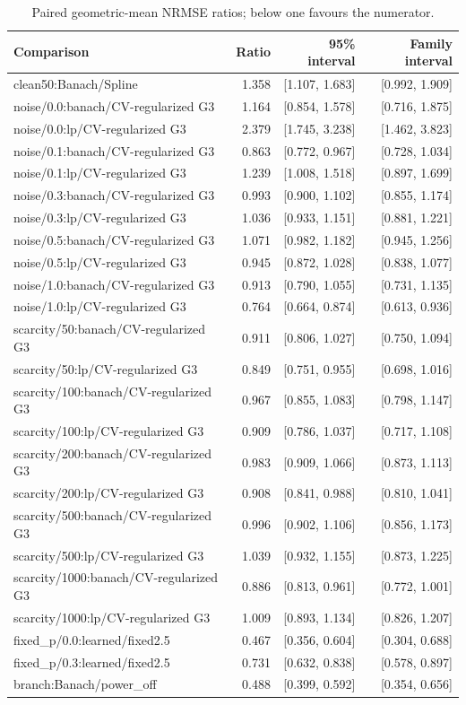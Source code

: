 \begin{longtable}{lrrr}
\caption{Paired geometric-mean NRMSE ratios; below one favours the numerator.}\label{tab:paired}\\
\toprule Comparison & Ratio & 95\% interval & Family interval \\ \midrule \endhead
clean50:Banach/Spline & 1.358 & [1.107, 1.683] & [0.992, 1.909] \\
noise/0.0:banach/CV-regularized G3 & 1.164 & [0.854, 1.578] & [0.716, 1.875] \\
noise/0.0:lp/CV-regularized G3 & 2.379 & [1.745, 3.238] & [1.462, 3.823] \\
noise/0.1:banach/CV-regularized G3 & 0.863 & [0.772, 0.967] & [0.728, 1.034] \\
noise/0.1:lp/CV-regularized G3 & 1.239 & [1.008, 1.518] & [0.897, 1.699] \\
noise/0.3:banach/CV-regularized G3 & 0.993 & [0.900, 1.102] & [0.855, 1.174] \\
noise/0.3:lp/CV-regularized G3 & 1.036 & [0.933, 1.151] & [0.881, 1.221] \\
noise/0.5:banach/CV-regularized G3 & 1.071 & [0.982, 1.182] & [0.945, 1.256] \\
noise/0.5:lp/CV-regularized G3 & 0.945 & [0.872, 1.028] & [0.838, 1.077] \\
noise/1.0:banach/CV-regularized G3 & 0.913 & [0.790, 1.055] & [0.731, 1.135] \\
noise/1.0:lp/CV-regularized G3 & 0.764 & [0.664, 0.874] & [0.613, 0.936] \\
scarcity/50:banach/CV-regularized G3 & 0.911 & [0.806, 1.027] & [0.750, 1.094] \\
scarcity/50:lp/CV-regularized G3 & 0.849 & [0.751, 0.955] & [0.698, 1.016] \\
scarcity/100:banach/CV-regularized G3 & 0.967 & [0.855, 1.083] & [0.798, 1.147] \\
scarcity/100:lp/CV-regularized G3 & 0.909 & [0.786, 1.037] & [0.717, 1.108] \\
scarcity/200:banach/CV-regularized G3 & 0.983 & [0.909, 1.066] & [0.873, 1.113] \\
scarcity/200:lp/CV-regularized G3 & 0.908 & [0.841, 0.988] & [0.810, 1.041] \\
scarcity/500:banach/CV-regularized G3 & 0.996 & [0.902, 1.106] & [0.856, 1.173] \\
scarcity/500:lp/CV-regularized G3 & 1.039 & [0.932, 1.155] & [0.873, 1.225] \\
scarcity/1000:banach/CV-regularized G3 & 0.886 & [0.813, 0.961] & [0.772, 1.001] \\
scarcity/1000:lp/CV-regularized G3 & 1.009 & [0.893, 1.134] & [0.826, 1.207] \\
fixed\_p/0.0:learned/fixed2.5 & 0.467 & [0.356, 0.604] & [0.304, 0.688] \\
fixed\_p/0.3:learned/fixed2.5 & 0.731 & [0.632, 0.838] & [0.578, 0.897] \\
branch:Banach/power\_off & 0.488 & [0.399, 0.592] & [0.354, 0.656] \\
\bottomrule\end{longtable}

